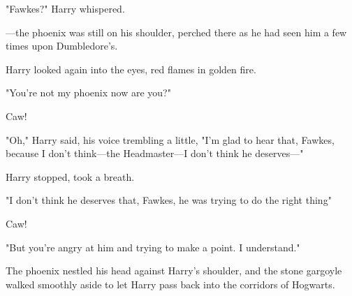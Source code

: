 "Fawkes?" Harry whispered.

---the phoenix was still on his shoulder, perched there as he had seen him a
few times upon Dumbledore's.

Harry looked again into the eyes, red flames in golden fire.

"You're not my phoenix now{\el} are you?"

Caw!

"Oh," Harry said, his voice trembling a little, "I'm glad to hear that, Fawkes,
because I don't think---the Headmaster---I don't think he deserves\mbox{---}"

Harry stopped, took a breath.

"I don't think he deserves that, Fawkes, he was trying to do the right
thing{\el}"

Caw!

"But you're angry at him and trying to make a point. I understand."

The phoenix nestled his head against Harry's shoulder, and the stone gargoyle
walked smoothly aside to let Harry pass back into the corridors of Hogwarts.
